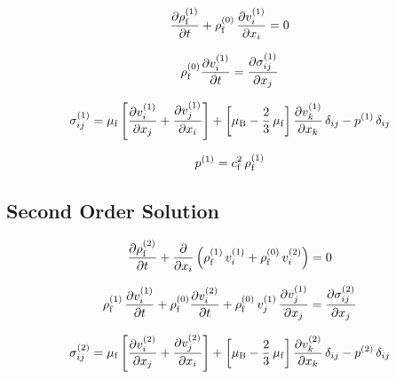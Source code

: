 \begin{equation}
  \pdv{  \rho_{\mathrm{f}}^{(1)}  }{t} + \rho_{\mathrm{f}}^{(0)}\,\pdv{  v_{i}^{(1)}  }{x_{i}} = 
  0
  \label{eq:Th-st-massconservatio}
\end{equation}

\begin{equation}
  \rho_{\mathrm{f}}^{(0)} \pdv{  v_{i}^{(1)}  }{t} = \pdv{  \sigma_{ij}^{(1)}  }{x_{j}}
  \label{eq:Th-st-navier}
\end{equation}

\begin{equation}
  \sigma_{ij}^{(1)} = \mu_{\mathrm{f}}\left[ \pdv{  v_{i}^{(1)}  }{x_{j}} + 
  \pdv{  v_{j}^{(1)}  }{x_{i}} \right] + \left[ \mu_{\mathrm{B}} - 
  \frac{2}{3}\,\mu_{\mathrm{f}} \right] \pdv{  v_{k}^{(1)}  }{x_{k}} \,\delta_{ij} - 
  p^{(1)}\,\delta_{ij}
  \label{eq:Th-st-stress}
\end{equation}

\begin{equation}
  p^{(1)} = c_{\mathrm{f}}^{2}\,\rho_{\mathrm{f}}^{(1)}
  \label{eq:Th-st-pre}
\end{equation}



\subsection{Second Order Solution\label{sec:Th-secondorder}}

\begin{equation}
  \pdv{  \rho_{\mathrm{f}}^{(2)}  }{t} + 
  \pdv{x_{i}}\left(\rho_{\mathrm{f}}^{(1)}\,v_{i}^{(1)} + 
  \rho_{\mathrm{f}}^{(0)}\,v_{i}^{(2)} \right) = 0
  \label{eq:Th-nd-massconservatio}
\end{equation}

\begin{equation}
  \rho_{\mathrm{f}}^{(1)}\,\pdv{  v_{i}^{(1)}  }{t} + \rho_{\mathrm{f}}^{(0)} 
  \pdv{  v_{i}^{(2)}  }{t} + 
  \rho_{\mathrm{f}}^{(0)}\,v_{j}^{(1)}\,\pdv{  v_{j}^{(1)}  }{x_{j}} = 
  \pdv{  \sigma_{ij}^{(2)}  }{x_{j}}
  \label{eq:Th-nd-navier}
\end{equation}

\begin{equation}
  \sigma_{ij}^{(2)} = \mu_{\mathrm{f}}\left[ \pdv{  v_{i}^{(2)}  }{x_{j}} + 
  \pdv{  v_{j}^{(2)}  }{x_{i}} \right] + \left[ \mu_{\mathrm{B}} - 
  \frac{2}{3}\,\mu_{\mathrm{f}} \right] \pdv{  v_{k}^{(2)}  }{x_{k}} \,\delta_{ij} - 
  p^{(2)}\,\delta_{ij}
  \label{eq:Th-nd-stress}
\end{equation}


